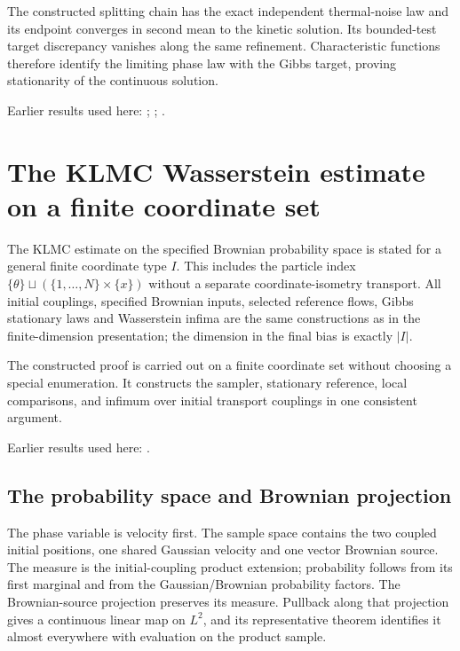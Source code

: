 \documentclass[11pt,a4paper]{report}
\begin{document}
The constructed splitting chain has the exact independent thermal-noise law and its endpoint converges in second mean to the kinetic solution. Its bounded-test target discrepancy vanishes along the same refinement. Characteristic functions therefore identify the limiting phase law with the Gibbs target, proving stationarity of the continuous solution.



Earlier results used here: \cite[Section~3.13.2]{LangevinLean2026ULASC}; \cite[Section~3.13.5]{LangevinLean2026ULASC}; \cite[Section~3.33.6]{LangevinLean2026ULASC}.
\section{\texorpdfstring{The KLMC Wasserstein estimate on a finite coordinate set}{The KLMC Wasserstein estimate on a finite coordinate set}}
\label{proof-module-KineticLangevin-GenericCanonicalKLMC-lean}


The KLMC estimate on the specified Brownian probability space is stated for a general finite coordinate type \(I\). This includes the particle index \(\{\theta\}\sqcup(\{1,\ldots,N\}\times\{x\})\) without a separate coordinate-isometry transport. All initial couplings, specified Brownian inputs, selected reference flows, Gibbs stationary laws and Wasserstein infima are the same constructions as in the finite-dimension presentation; the dimension in the final bias is exactly \(|I|\).



The constructed proof is carried out on a finite coordinate set without choosing a special enumeration. It constructs the sampler, stationary reference, local comparisons, and infimum over initial transport couplings in one consistent argument.



Earlier results used here: \cite[Section~3.18]{LangevinLean2026ULASC}.
\subsection{\texorpdfstring{The probability space and Brownian projection}{The probability space and Brownian projection}}
\label{report-step-KineticLangevin-GenericCanonicalKLMC-lean-1}


The phase variable is velocity first. The sample space contains the two coupled initial positions, one shared Gaussian velocity and one vector Brownian source. The measure is the initial-coupling product extension; probability follows from its first marginal and from the Gaussian/\allowbreak{}Brownian probability factors. The Brownian-source projection preserves its measure. Pullback along that projection gives a continuous linear map on \(L^{2}\), and its representative theorem identifies it almost everywhere with evaluation on the product sample.
\end{document}
